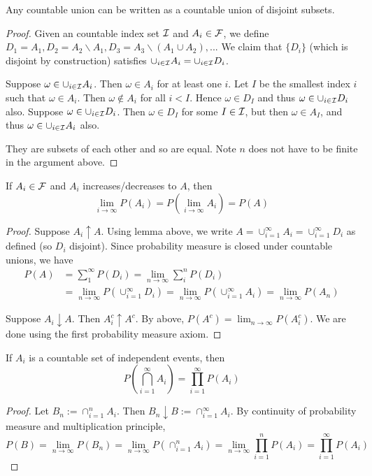 \documentclass[11pt]{article}
\begin{document}
\begin{lemma}
  Any countable union can be written as a countable union of disjoint subsets.  
\end{lemma}
\begin{proof}
  Given an countable index set \(\cal{I}\) and \(A_i\in\cal{F}\), we define \(D_1=A_1,D_2=A_2\backslash A_1, D_3=A_3\backslash (A_1\cup A_2),...\)
  We claim that \(\{D_i\}\) (which is disjoint by construction) satisfies \(\cup_{i\in\cal{I}}A_i=\cup_{i\in\cal{I}}D_i\).

  \subproof{}
  Suppose \(\omega\in\cup_{i\in\cal{I}}A_i\). Then \(\omega\in A_i\) for at least one \(i\). Let \(I\) be the smallest index \(i\) such that \(\omega\in A_i\). Then \(\omega\notin A_i\) for all \(i<I\). Hence \(\omega\in D_I\) and thus \(\omega\in\cup_{i\in\cal{I}}D_i\) also.
  \subproof{}
  Suppose \(\omega\in\cup_{i\in\cal{I}}D_i\). Then \(\omega\in D_I\) for some \(I\in\cal{I}\), but then \(\omega\in A_I\), and thus \(\omega\in\cup_{i\in\cal{I}}A_i\) also.
  
  They are subsets of each other and so are equal. Note \(n\) does not have to be finite in the argument above.
\end{proof}

\begin{theorem}
  If \(A_i\in\cal{F}\) and \(A_i\) increases/decreases to \(A\), then \[\lim_{i\to\infty}P(A_i)=P(\lim_{i\to\infty}A_i)=P(A)\]
\end{theorem}
\begin{proof}
  Suppose \(A_i\uparrow A\). Using lemma above, we write \(A=\cup_{i=1}^\infty A_i=\cup_{i=1}^\infty D_i\) as defined (so \(D_i\) disjoint). Since probability measure is closed under countable unions, we have
  \begin{align*}
    P(A)&=\sum_1^\infty P(D_i)=\lim_{n\to\infty}\sum_i^n P(D_i)\\ &=\lim_{n\to\infty} P(\cup_{i=1}^\infty D_i)=\lim_{n\to\infty} P(\cup_{i=1}^\infty A_i)=\lim_{n\to\infty} P(A_n) 
  \end{align*}

  Suppose \(A_i\downarrow A\). Then \(A_i^c\uparrow A^c\). By above, \(P(A^c)=\lim_{n\to\infty}P(A_i^c)\). We are done using the first probability measure axiom.
\end{proof}

\begin{theorem}
  If \(A_i\) is a countable set of independent events, then
  \[P\left(\bigcap_{i=1}^\infty A_i\right)=\prod_{i=1}^\infty P(A_i)\]
\end{theorem}
\begin{proof}
  Let \(B_n:=\cap_{i=1}^n A_i\). Then \(B_n\downarrow B:=\cap_{i=1}^\infty A_i\). By continuity of probability measure and multiplication principle,
  \[P(B)=\lim_{n\to\infty} P(B_n)=\lim_{n\to\infty}P(\cap_{i=1}^n A_i)=\lim_{n\to\infty}\prod_{i=1}^n P(A_i)=\prod_{i=1}^\infty P(A_i)\]
\end{proof}
\end{document}
